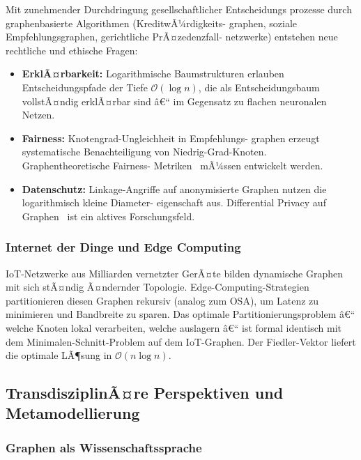 ﻿\documentclass[12pt,a4paper,twoside]{article}
\theoremstyle{definition}
\theoremstyle{plain}
\theoremstyle{remark}
\begin{document}
Mit zunehmender Durchdringung gesellschaftlicher Entscheidungs\-
prozesse durch graphenbasierte Algorithmen (KreditwÃ¼rdigkeits-
graphen, soziale Empfehlungsgraphen, gerichtliche PrÃ¤zedenzfall-
netzwerke) entstehen neue rechtliche und ethische Fragen:
\begin{itemize}
  \item \textbf{ErklÃ¤rbarkeit:} Logarithmische Baumstrukturen
        erlauben Entscheidungspfade der Tiefe $\mathcal{O}(\log n)$,
        die als Entscheidungsbaum vollstÃ¤ndig erklÃ¤rbar sind â€“
        im Gegensatz zu flachen neuronalen Netzen.
  \item \textbf{Fairness:} Knotengrad-Ungleichheit in Empfehlungs-
        graphen erzeugt systematische Benachteiligung von
        Niedrig-Grad-Knoten.  Graphentheoretische Fairness-
        Metriken~\cite{Saxena2022} mÃ¼ssen entwickelt werden.
  \item \textbf{Datenschutz:} Linkage-Angriffe auf anonymisierte
        Graphen nutzen die logarithmisch kleine Diameter-
        eigenschaft aus.  Differential Privacy auf Graphen~\cite{Hay2009}
        ist ein aktives Forschungsfeld.
\end{itemize}

\subsubsection{Internet der Dinge und Edge Computing}

IoT-Netzwerke aus Milliarden vernetzter GerÃ¤te bilden
dynamische Graphen mit sich stÃ¤ndig Ã¤ndernder Topologie.
Edge-Computing-Strategien~\cite{Shi2016} partitionieren
diesen Graphen rekursiv (analog zum OSA), um Latenz zu
minimieren und Bandbreite zu sparen.  Das optimale
Partitionierungsproblem â€“ welche Knoten lokal verarbeiten,
welche auslagern â€“ ist formal identisch mit dem
Minimalen-Schnitt-Problem auf dem IoT-Graphen.
Der Fiedler-Vektor liefert die optimale LÃ¶sung in
$\mathcal{O}(n \log n)$.

\subsection{TransdisziplinÃ¤re Perspektiven und Metamodellierung}
\label{sub:meta}

\subsubsection{Graphen als Wissenschaftssprache}
\end{document}
